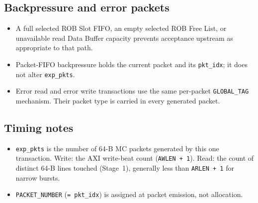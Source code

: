 \subsection{Backpressure and error packets}

\begin{itemize}[noitemsep]
  \item A full selected ROB Slot FIFO, an empty selected ROB Free List, or
        unavailable read Data Buffer capacity prevents acceptance upstream as
        appropriate to that path.
  \item Packet-FIFO backpressure holds the current packet and its
        \texttt{pkt\_idx}; it does not alter \texttt{exp\_pkts}.
  \item Error read and error write transactions use the same per-packet
        \texttt{GLOBAL\_TAG} mechanism.  Their packet type is carried in
        every generated packet.
\end{itemize}

\subsection{Timing notes}

\begin{itemize}[noitemsep]
  \item \texttt{exp\_pkts} is the number of 64-B MC packets generated by this
        one transaction.  Write: the AXI write-beat count
        (\texttt{AWLEN + 1}).  Read: the count of distinct 64-B lines touched
        (Stage~1), generally less than \texttt{ARLEN + 1} for narrow bursts.
  \item \texttt{PACKET\_NUMBER} (\texttt{= pkt\_idx}) is assigned at packet
        emission, not allocation.
\end{itemize}
